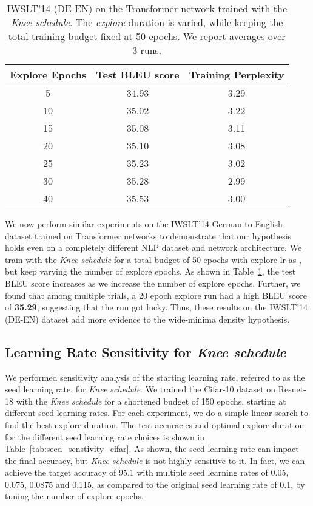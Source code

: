 \documentclass[twoside,11pt]{article}
\newcommand{\lrschedule}{\textit{Knee schedule}}
\begin{document}
\begin{table}[h]
\small
\centering
\caption{IWSLT'14 (DE-EN) on the Transformer network trained with the \lrschedule{}. The \textit{explore} duration is varied, while keeping the total training budget fixed at 50 epochs. We report averages over 3 runs.}

\begin{tabular}{ccc}
  \toprule
  Explore Epochs & Test BLEU score & Training Perplexity \\
  \midrule
5  & 34.93 & 3.29 \\ 
  10 & 35.02 & 3.22 \\ 
  15 & 35.08 & 3.11 \\ 
  20 & 35.10  & 3.08 \\ 
  25 & 35.23 & 3.02 \\ 
  30 & 35.28 & 2.99 \\
  40 & 35.53 & 3.00 \\
  \bottomrule
\end{tabular}
\label{tab:warmup_accuracy_iwslt}
\end{table}

We now perform similar experiments on the IWSLT'14 German to English dataset \citep{iwslt_dataset_cettolo2014} trained on Transformer networks \citep{vaswani2017attention} to demonstrate that our hypothesis holds even on a completely different NLP dataset and network architecture. We train with the \lrschedule{} for a total budget of 50 epochs with explore lr as , but keep varying the number of explore epochs. As shown in Table~\ref{tab:warmup_accuracy_iwslt}, the test BLEU score increases as we increase the number of explore epochs. Further, we found that among multiple trials, a 20 epoch explore run had a high BLEU score of \textbf{35.29}, suggesting that the run got lucky. Thus, these results on the IWSLT'14 (DE-EN) dataset add more evidence to the wide-minima density hypothesis. 

\vspace{6pt} \subsection{Learning Rate Sensitivity for \lrschedule{}}
\label{sec:seed_sensitivity}

We performed sensitivity analysis of the starting learning rate, referred to as the seed learning rate, for \lrschedule{}. We trained the Cifar-10 dataset on Resnet-18 with the \lrschedule{} for a shortened budget of 150 epochs, starting at different seed learning rates. For each experiment, we do a simple linear search to find the best explore duration. The test accuracies and optimal explore duration for the different seed learning rate choices is shown in Table~\ref{tab:seed_senstivity_cifar}. As shown, the seed learning rate can impact the final accuracy, but \lrschedule{} is not highly sensitive to it. In fact, we can achieve the target accuracy of 95.1 with multiple seed learning rates of 0.05, 0.075, 0.0875 and 0.115, as compared to the original seed learning rate of 0.1, by tuning the number of explore epochs.
\end{document}

